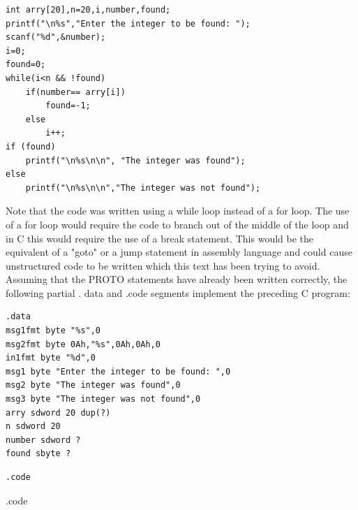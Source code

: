 \documentclass[10pt]{book}
\begin{document}
\begin{verbatim}
int arry[20],n=20,i,number,found;
printf("\n%s","Enter the integer to be found: ");
scanf("%d",&number);
i=0;
found=0;
while(i<n && !found)
    if(number== arry[i])
        found=-1;
    else
        i++;
if (found)
    printf("\n%s\n\n", "The integer was found");
else
    printf("\n%s\n\n","The integer was not found");
\end{verbatim}

Note that the code was written using a while loop instead of a for loop. The use of a for loop would require the code to branch out of the middle of the loop and in C this would require the use of a break statement. This would be the equivalent of a "goto" or a jump statement in assembly language and could cause unstructured code to be written which this text has been trying to avoid. Assuming that the PROTO statements have already been written correctly, the following partial . data and .code segments implement the preceding C program:

\begin{verbatim}
.data
msg1fmt byte "%s",0
msg2fmt byte 0Ah,"%s",0Ah,0Ah,0
in1fmt byte "%d",0
msg1 byte "Enter the integer to be found: ",0
msg2 byte "The integer was found",0
msg3 byte "The integer was not found",0
arry sdword 20 dup(?)
n sdword 20
number sdword ?
found sbyte ?
\end{verbatim}

\begin{verbatim}
.code
\end{verbatim}

.code\\
\end{document}
